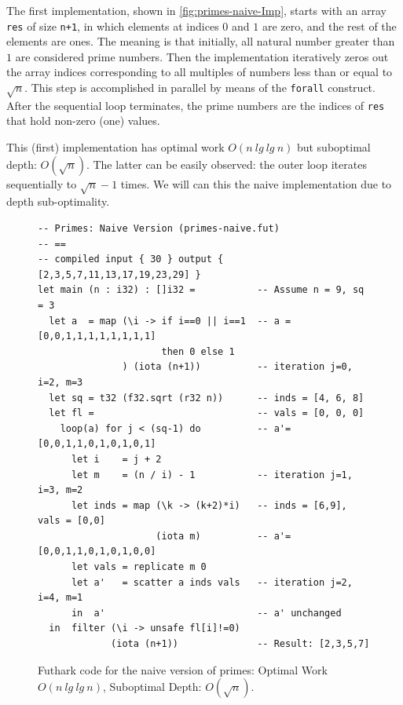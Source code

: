 \documentclass[acmsmall,review]{acmart}\settopmatter{printfolios=true,printccs=false,printacmref=false}
\begin{document}
\medskip

The first implementation, shown in \cref{fig:primes-naive-Imp}, starts 
with an array {\tt res} of size {\tt n+1}, in which elements at 
indices $0$ and $1$ are zero, and the rest of the elements are ones. 
The meaning is that initially, all natural number greater than $1$ 
are considered prime numbers.
Then the implementation iteratively zeros out the array indices 
corresponding to all multiples of numbers less than or equal to $\sqrt{n}$.
This step is accomplished in parallel by means of the \lstinline{forall}
construct.   After the sequential loop terminates, the prime numbers
are the indices of {\tt res} that hold non-zero (one) values.

This (first) implementation has optimal work $O(n \ lg \ lg \ n)$ 
but suboptimal depth: $O(\sqrt{n})$. The latter can be easily observed:
the outer loop iterates sequentially to $\sqrt{n}-1$ times. We will
can this the naive implementation due to depth sub-optimality.

\begin{figure}
\begin{lstlisting}[mathescape=true]
-- Primes: Naive Version (primes-naive.fut)
-- ==
-- compiled input { 30 } output { [2,3,5,7,11,13,17,19,23,29] }
let main (n : i32) : []i32 =           -- Assume n = 9, sq = 3 
  let a  = map (\i -> if i==0 || i==1  -- a = [0,0,1,1,1,1,1,1,1,1]
                      then 0 else 1
               ) (iota (n+1))          -- iteration j=0, i=2, m=3
  let sq = t32 (f32.sqrt (r32 n))      -- inds = [4, 6, 8]
  let fl =                             -- vals = [0, 0, 0]
    loop(a) for j < (sq-1) do          -- a'= [0,0,1,1,0,1,0,1,0,1]
      let i    = j + 2
      let m    = (n / i) - 1           -- iteration j=1, i=3, m=2
      let inds = map (\k -> (k+2)*i)   -- inds = [6,9], vals = [0,0]
                     (iota m)          -- a'= [0,0,1,1,0,1,0,1,0,0]
      let vals = replicate m 0         
      let a'   = scatter a inds vals   -- iteration j=2, i=4, m=1
      in  a'                           -- a' unchanged
  in  filter (\i -> unsafe fl[i]!=0)   
             (iota (n+1))              -- Result: [2,3,5,7]
\end{lstlisting}\vspace{-4ex}
\caption{Futhark code for the naive version of primes:
            Optimal Work $O(n \ lg \ lg \ n)$, Suboptimal Depth: $O(\sqrt{n})$.}
\label{fig:primes-naive-Futhark}
\end{figure}

\medskip
\end{document}

